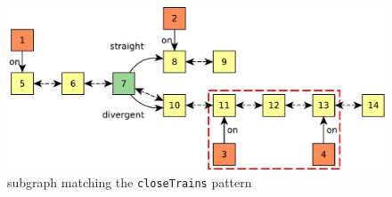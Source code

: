 \begin{figure}[H]
	\begin{center}
		\includegraphics[width=\textwidth]{figures/query-example-model-closetrains.pdf}
	\end{center}
	\caption{subgraph matching the \texttt{closeTrains} pattern}
	\label{fig:match-closeTrains}
\end{figure}









